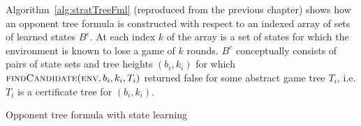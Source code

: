 Algorithm~\ref{alg:stratTreeFml} (reproduced from the previous chapter) shows how an opponent tree formula is constructed with respect to an indexed array of sets of learned states $B^e$. At each index $k$ of the array is a set of states for which the environment is known to lose a game of $k$ rounds. $B^e$ conceptually consists of pairs of state sets and tree heights $(b_i, k_i)$ for which $\textsc{findCandidate}(\textsc{env}, b_i, k_i, T_i)$ returned false for some abstract game tree $T_i$, i.e. $T_i$ is a certificate tree for $(b_i, k_i)$.

\begin{algorithm}
    \caption{Opponent tree formula with state learning}
    \label{alg:stratTreeFml}
    \begin{algorithmic}[1]
        \State {}
        \Else
        \State {}
        \EndIf
        \EndFunction
    \end{algorithmic}
\end{algorithm}

